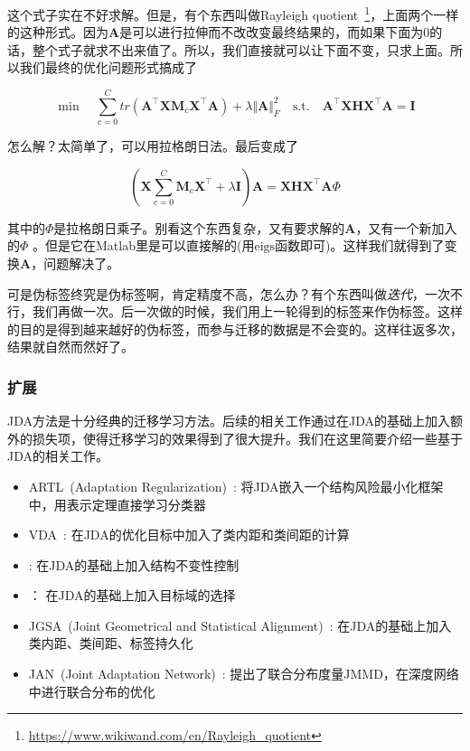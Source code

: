 这个式子实在不好求解。但是，有个东西叫做Rayleigh quotient~\footnote{\url{https://www.wikiwand.com/en/Rayleigh_quotient}}，上面两个一样的这种形式。因为$\mathbf{A}$是可以进行拉伸而不改改变最终结果的，而如果下面为0的话，整个式子就求不出来值了。所以，我们直接就可以让下面不变，只求上面。所以我们最终的优化问题形式搞成了

\begin{equation}
	\min \quad \sum_{c=0}^{C}tr(\mathbf{A}^\top \mathbf{X} \mathbf{M}_c \mathbf{X}^\top \mathbf{A}) + \lambda \Vert \mathbf{A} \Vert ^2_F \quad \text{s.t.} \quad \mathbf{A}^\top \mathbf{X} \mathbf{H} \mathbf{X}^\top \mathbf{A} = \mathbf{I}
\end{equation}

怎么解？太简单了，可以用拉格朗日法。最后变成了

\begin{equation}
	\left(\mathbf{X} \sum_{c=0}^{C} \mathbf{M}_c \mathbf{X}^\top + \lambda \mathbf{I}\right) \mathbf{A} =\mathbf{X} \mathbf{H} \mathbf{X}^\top \mathbf{A} \Phi 
\end{equation}

其中的$\Phi$是拉格朗日乘子。别看这个东西复杂，又有要求解的$\mathbf{A}$，又有一个新加入的$\Phi$ 。但是它在Matlab里是可以直接解的(用$\mathrm{eigs}$函数即可)。这样我们就得到了变换$\mathbf{A}$，问题解决了。

可是伪标签终究是伪标签啊，肯定精度不高，怎么办？有个东西叫做\textit{迭代}，一次不行，我们再做一次。后一次做的时候，我们用上一轮得到的标签来作伪标签。这样的目的是得到越来越好的伪标签，而参与迁移的数据是不会变的。这样往返多次，结果就自然而然好了。

\subsubsection{扩展}

JDA方法是十分经典的迁移学习方法。后续的相关工作通过在JDA的基础上加入额外的损失项，使得迁移学习的效果得到了很大提升。我们在这里简要介绍一些基于JDA的相关工作。

\begin{itemize}
	\item ARTL~(Adaptation Regularization)~\cite{long2014adaptation}: 将JDA嵌入一个结构风险最小化框架中，用表示定理直接学习分类器
	\item VDA~\cite{tahmoresnezhad2016visual}: 在JDA的优化目标中加入了类内距和类间距的计算
	\item \cite{hsiao2016learning}: 在JDA的基础上加入结构不变性控制
	\item \cite{hou2015unsupervised}： 在JDA的基础上加入目标域的选择
	\item JGSA~(Joint Geometrical and Statistical Alignment)~\cite{zhang2017joint}: 在JDA的基础上加入类内距、类间距、标签持久化
	\item JAN~(Joint Adaptation Network)~\cite{long2017deep}: 提出了联合分布度量JMMD，在深度网络中进行联合分布的优化
\end{itemize}

